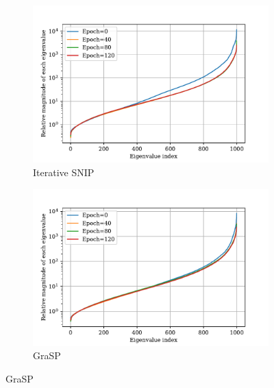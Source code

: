 \documentclass{article} %
\begin{document}
\begin{figure}
  \centering
  \begin{subfigure}[b]{.49\textwidth}
    \includegraphics[width=\textwidth]{plots/nips_rebuttal/during/itersnip.pdf}
  \caption{\small Iterative SNIP}

  \end{subfigure}
  \begin{subfigure}[b]{.49\textwidth}
    \includegraphics[width=\textwidth]{plots/nips_rebuttal/during/grasp.pdf}
   \caption{\small GraSP}


\end{subfigure}
\end{figure}
\end{document}
